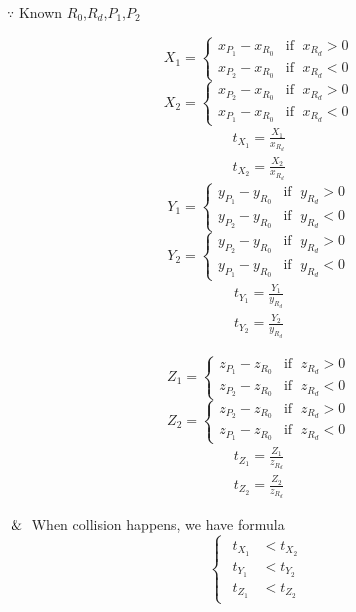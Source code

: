 $\because$ Known $R_0$,\enspace$R_d$,\enspace$P_1$,\enspace$P_2$
\begin{multicols}{2}
\noindent
\[
X_1 =
\begin{cases}
x_{P_1} - x_{R_0} & \text{if }\;x_{R_d} > 0 \\
x_{P_2} - x_{R_0} & \text{if }\;x_{R_d} < 0
\end{cases}
\]
\[
X_2 =
\begin{cases}
x_{P_2} - x_{R_0} & \text{if }\;x_{R_d} > 0 \\
x_{P_1} - x_{R_0} & \text{if }\;x_{R_d} < 0
\end{cases}
\]
\[
\begin{array}{lr}
t_{X_1} = \frac{X_1}{x_{R_d}} \\
t_{X_2} = \frac{X_2}{x_{R_d}}
\end{array}
\]
\columnbreak
\[
Y_1 =
\begin{cases}
y_{P_1} - y_{R_0} & \text{if }\;y_{R_d} > 0 \\
y_{P_2} - y_{R_0} & \text{if }\;y_{R_d} < 0
\end{cases}
\]
\[
Y_2 =
\begin{cases}
y_{P_2} - y_{R_0} & \text{if }\;y_{R_d} > 0 \\
y_{P_1} - y_{R_0} & \text{if }\;y_{R_d} < 0
\end{cases}
\]
\[
\begin{array}{lr}
t_{Y_1} = \frac{Y_1}{y_{R_d}} \\
t_{Y_2} = \frac{Y_2}{y_{R_d}}
\end{array}
\]
\end{multicols}
\begin{multicols}{2}
\noindent
\[
Z_1 =
\begin{cases}
z_{P_1} - z_{R_0} & \text{if }\;z_{R_d} > 0 \\
z_{P_2} - z_{R_0} & \text{if }\;z_{R_d} < 0
\end{cases}
\]
\[
Z_2 =
\begin{cases}
z_{P_2} - z_{R_0} & \text{if }\;z_{R_d} > 0 \\
z_{P_1} - z_{R_0} & \text{if }\;z_{R_d} < 0
\end{cases}
\]
\[
\begin{array}{lr}
t_{Z_1} = \frac{Z_1}{z_{R_d}} \\
t_{Z_2} = \frac{Z_2}{z_{R_d}}
\end{array}
\]
\columnbreak
\[
\]
\end{multicols}

$\And$ When collision happens,  we have formula
\[
\left\{
\begin{array}{lr}
\begin{aligned}
t_{X_1} &< t_{X_2} \\
t_{Y_1} &< t_{Y_2} \\
t_{Z_1} &< t_{Z_2}
\end{aligned}
\end{array}
\right.
\]

